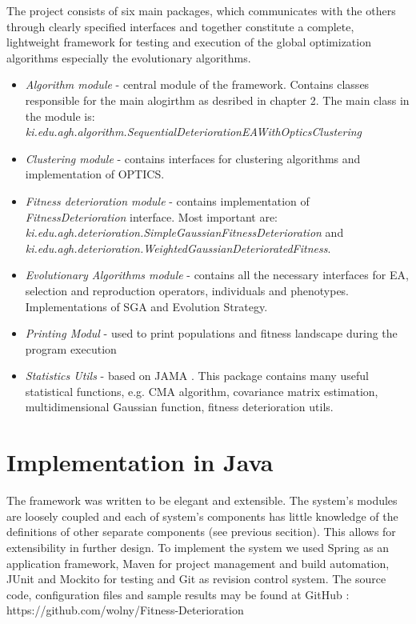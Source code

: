 The project consists of six main packages, which communicates with the
others through clearly specified interfaces and together constitute a
complete, lightweight framework for testing and execution of the global 
optimization algorithms especially the evolutionary algorithms.
\begin{itemize}
  \item \textit{Algorithm module} - central module of the framework. Contains
  classes responsible for the main alogirthm as desribed in chapter 2.
  The main class in the module is:
  \textit{ki.edu.agh.algorithm.SequentialDeteriorationEAWithOpticsClustering}
  \item \textit{Clustering module} - contains interfaces for clustering
  algorithms and implementation of OPTICS.
  \item \textit{Fitness deterioration module} - contains implementation of
  \textit{FitnessDeterioration} interface. Most important are:
  \textit{ki.edu.agh.deterioration.SimpleGaussianFitnessDeterioration} and 
  \textit{ki.edu.agh.deterioration.WeightedGaussianDeterioratedFitness}.
  \item \textit{Evolutionary Algorithms module} - contains all the necessary
  interfaces for EA, selection and reproduction operators, individuals and
  phenotypes. Implementations of SGA and Evolution Strategy. 
  \item \textit{Printing Modul} - used to print populations and fitness
  landscape during the program execution
  \item \textit{Statistics Utils} - based on JAMA \cite{jama}. This package
  contains many useful statistical functions, e.g. CMA algorithm, covariance
  matrix estimation, multidimensional Gaussian function, fitness deterioration
  utils.
\end{itemize}

\section{Implementation in Java}
The framework was written to be elegant and extensible. The system's 
modules are loosely coupled and each of system's components has little knowledge of the definitions 
of other separate components (see previous secition). This allows for
extensibility in further design. To implement the system we used Spring
\cite{spring} as an application framework, Maven \cite{maven} for project
management and build automation, JUnit \cite{junit} and Mockito \cite{mockito}
for testing and Git \cite{git} as revision control system. 
The source code, configuration files and sample results may be found at 
GitHub \cite{github}: https://github.com/wolny/Fitness-Deterioration

